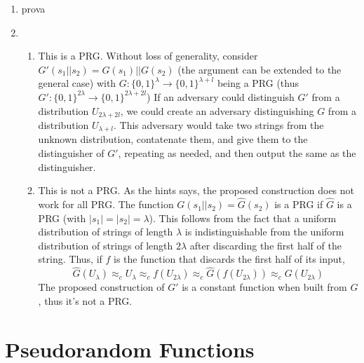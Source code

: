 \documentclass{article}
\newcommand{\compind}{\approx_c}
\newcommand{\abs}[1]{\left| {#1} \right|}
\begin{document}
\begin{enumerate}
	\item prova

	\item
		\begin{enumerate}
			\item This is a PRG.
				Without loss of generality, consider $G'(s_1 || s_2) = G(s_1) || G(s_2)$ (the argument can be extended to the general case) with $G : \{0,1\}^{\lambda} \to \{0,1\}^{\lambda + l}$ being a PRG (thus $G' : \{0,1\}^{2\lambda} \to \{0,1\}^{2\lambda + 2l}$)
				If an adversary could distinguish $G'$ from a distribution $U_{2\lambda + 2l}$, we could create an adversary distinguishing $G$ from a distribution $U_{\lambda + l}$.
				This adversary would take two strings from the unknown distribution, contatenate them, and give them to the distinguisher of $G'$, repeating as needed, and then output the same as the distinguisher.
			\item This is not a PRG.
				As the hints says, the proposed construction does not work for all PRG.
				The function $G(s_1 || s_2) = \hat{G}(s_2)$ is a PRG if $\hat{G}$ is a PRG (with $\abs{s_1} = \abs{s_2} = \lambda$).
				This follows from the fact that a uniform distribution of strings of length $\lambda$ is indistinguishable from the uniform distribution of strings of length $2\lambda$ after discarding the first half of the string.
				Thus, if $f$ is the function that discards the first half of its input,
				\[
					\hat{G}(U_{\lambda}) \compind U_{\lambda} \compind f(U_{2\lambda}) \compind \hat{G}(f(U_{2\lambda})) \compind G(U_{2\lambda})
				\]
				The proposed construction of $G'$ is a constant function when built from $G$, thus it's not a PRG.
		\end{enumerate}
\end{enumerate}

\section{Pseudorandom Functions}
\end{document}
